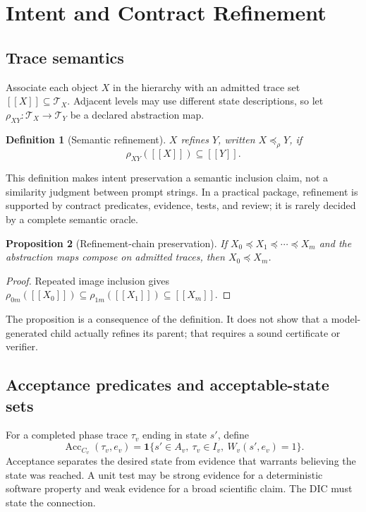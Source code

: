 \documentclass[11pt,a4paper]{article}
\newtheorem{definition}{Definition}[section]
\newtheorem{proposition}[definition]{Proposition}
\newcommand{\Trace}{\mathcal T}
\newcommand{\Acc}{\operatorname{Acc}}
\newcommand{\llbracket}{[\![}
\newcommand{\rrbracket}{]\!]}
\begin{document}
\section{Intent and Contract Refinement}
\subsection{Trace semantics}
Associate each object $X$ in the hierarchy with an admitted trace set $\llbracket X\rrbracket\subseteq\Trace_X$. Adjacent levels may use different state descriptions, so let $\rho_{XY}:\Trace_X\to\Trace_Y$ be a declared abstraction map.
\begin{definition}[Semantic refinement]
$X$ refines $Y$, written $X\preceq_{\rho}Y$, if
\[
\rho_{XY}(\llbracket X\rrbracket)\subseteq \llbracket Y\rrbracket.
\]
\end{definition}
This definition makes intent preservation a semantic inclusion claim, not a similarity judgment between prompt strings. In a practical package, refinement is supported by contract predicates, evidence, tests, and review; it is rarely decided by a complete semantic oracle.

\begin{proposition}[Refinement-chain preservation]
If $X_0\preceq X_1\preceq\cdots\preceq X_m$ and the abstraction maps compose on admitted traces, then $X_0\preceq X_m$.
\end{proposition}
\begin{proof}
Repeated image inclusion gives
$\rho_{0m}(\llbracket X_0\rrbracket)\subseteq\rho_{1m}(\llbracket X_1\rrbracket)\subseteq\llbracket X_m\rrbracket$.
\end{proof}
The proposition is a consequence of the definition. It does not show that a model-generated child actually refines its parent; that requires a sound certificate or verifier.

\subsection{Acceptance predicates and acceptable-state sets}
For a completed phase trace $\tau_v$ ending in state $s'$, define
\[
\Acc_{C_v}(\tau_v,e_v)=\mathbf 1\{s'\in A_v,\ \tau_v\in I_v,\ W_v(s',e_v)=1\}.
\]
Acceptance separates the desired state from evidence that warrants believing the state was reached. A unit test may be strong evidence for a deterministic software property and weak evidence for a broad scientific claim. The DIC must state the connection.
\end{document}
